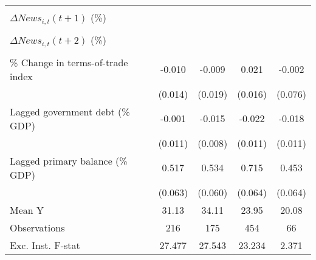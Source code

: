 {\begin{tabular}{l*{4}{c}}
                    &                     &                     &                     &                     \\
\addlinespace
$ \Delta News_{i,t}(t+1)$ (\%)&                     &                     &                     &                     \\
                    &                     &                     &                     &                     \\
\addlinespace
$ \Delta News_{i,t}(t+2)$ (\%)&                     &                     &                     &                     \\
                    &                     &                     &                     &                     \\
\addlinespace
\% Change in terms-of-trade index&      -0.010         &      -0.009         &       0.021         &      -0.002         \\
                    &     (0.014)         &     (0.019)         &     (0.016)         &     (0.076)         \\
\addlinespace
Lagged government debt (\% GDP)&      -0.001         &      -0.015\sym{*}  &      -0.022\sym{**} &      -0.018         \\
                    &     (0.011)         &     (0.008)         &     (0.011)         &     (0.011)         \\
\addlinespace
Lagged primary balance (\% GDP)&       0.517\sym{***}&       0.534\sym{***}&       0.715\sym{***}&       0.453\sym{***}\\
                    &     (0.063)         &     (0.060)         &     (0.064)         &     (0.064)         \\
\midrule
Mean Y              &       31.13         &       34.11         &       23.95         &       20.08         \\
Observations        &         216         &         175         &         454         &          66         \\
Exc. Inst. F-stat   &      27.477         &      27.543         &      23.234         &       2.371         \\
\bottomrule
\end{tabular}
}
